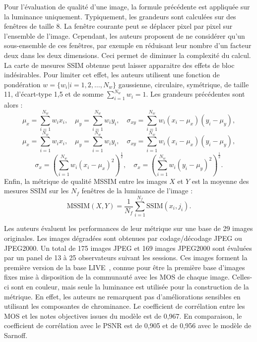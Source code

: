 Pour l'évaluation de qualité d'une image, la formule précédente est appliquée sur la luminance uniquement. Typiquement, les grandeurs sont calculées sur des fenêtres de taille 8. La fenêtre courante peut se déplacer pixel par pixel sur l'ensemble de l'image. Cependant, les auteurs proposent de ne considérer qu'un sous-ensemble de ces fenêtres, par exemple en réduisant leur nombre d'un facteur deux dans les deux dimensions. Ceci permet de diminuer la complexité du calcul. La carte de mesures SSIM obtenue peut laisser apparaitre des effets de bloc indésirables. Pour limiter cet effet, les auteurs utilisent une fonction de pondération $w = \{w_i|i=1,2,\dots,N_w\}$ gaussienne, circulaire, symétrique, de taille 11, d'écart-type 1,5 et de somme $\sum_{i=1}^{N_w}w_i=1$. Les grandeurs précédentes sont alors :
\begin{equation}
\mu_x = \sum\limits_{i=1}^{N_w} w_i x_i , \quad \mu_y = \sum\limits_{i=1}^{N_w} w_i y_i, \quad \sigma_{xy} = \sum\limits_{i=1}^{N_w} w_i(x_i-\mu_x)(y_i-\mu_y),
\end{equation}
\begin{equation}
\mu_x = \sum\limits_{i=1}^{N_w} w_i x_i , \quad \mu_y = \sum\limits_{i=1}^{N_w} w_i y_i, \quad \sigma_{xy} = \sum\limits_{i=1}^{N_w} w_i(x_i-\mu_x)(y_i-\mu_y),
\end{equation}
\begin{equation}
\sigma_x = \left(\sum\limits_{i=1}^{N_w} w_i(x_i-\mu_x)^2\right)^{\frac{1}{2}}, \quad \sigma_x = \left(\sum\limits_{i=1}^{N_w} w_i(y_i-\mu_y)^2\right)^{\frac{1}{2}}.
\end{equation}
%
Enfin, la métrique de qualité MSSIM entre les images $X$ et $Y$ est la moyenne des mesures SSIM sur les $N_f$ fenêtres de la luminance de l'image :
\begin{equation}
\text{MSSIM}(X,Y) = \frac{1}{N_f} \sum\limits_{i=1}^{N_f} \text{SSIM}(x_i,j_i).
\end{equation}

Les auteurs évaluent les performances de leur métrique sur une base de 29 images originales. Les images dégradées sont obtenues par codage/décodage JPEG ou JPEG2000. Un total de 175 images JPEG et 169 images JPEG2000 sont évaluées par un panel de 13 à 25 observateurs suivant les sessions. Ces images forment la première version de la base LIVE~\cite{sheikh-live}, connue pour être la première base d'images fixes mise à disposition de la communauté avec les MOS de chaque image. Celles-ci sont en couleur, mais seule la luminance est utilisée pour la construction de la métrique. En effet, les auteurs ne remarquent pas d'améliorations sensibles en utilisant les composantes de chrominance. Le coefficient de corrélation entre les MOS et les notes objectives issues du modèle est de 0,967. En comparaison, le coefficient de corrélation avec le PSNR est de 0,905 et de 0,956 avec le modèle de Sarnoff.

